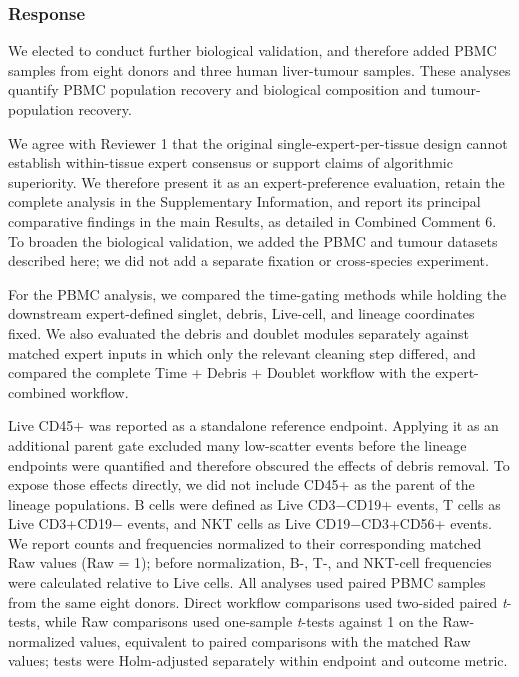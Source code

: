 \documentclass[
  11pt,
  a4paper,
]{article}
\begin{document}
\subsubsection{Response}\label{response-2}

We elected to conduct further biological validation, and therefore added
PBMC samples from eight donors and three human liver-tumour samples.
These analyses quantify PBMC population recovery and biological
composition and tumour-population recovery.

We agree with Reviewer 1 that the original single-expert-per-tissue
design cannot establish within-tissue expert consensus or support claims
of algorithmic superiority. We therefore present it as an
expert-preference evaluation, retain the complete analysis in the
Supplementary Information, and report its principal comparative findings
in the main Results, as detailed in Combined Comment 6. To broaden the
biological validation, we added the PBMC and tumour datasets described
here; we did not add a separate fixation or cross-species experiment.

For the PBMC analysis, we compared the time-gating methods while holding
the downstream expert-defined singlet, debris, Live-cell, and lineage
coordinates fixed. We also evaluated the debris and doublet modules
separately against matched expert inputs in which only the relevant
cleaning step differed, and compared the complete Time + Debris +
Doublet workflow with the expert-combined workflow.

Live CD45+ was reported as a standalone reference endpoint. Applying it
as an additional parent gate excluded many low-scatter events before the
lineage endpoints were quantified and therefore obscured the effects of
debris removal. To expose those effects directly, we did not include
CD45+ as the parent of the lineage populations. B cells were defined as
Live CD3−CD19+ events, T cells as Live CD3+CD19− events, and NKT cells
as Live CD19−CD3+CD56+ events. We report counts and frequencies
normalized to their corresponding matched Raw values (Raw = 1); before
normalization, B-, T-, and NKT-cell frequencies were calculated relative
to Live cells. All analyses used paired PBMC samples from the same eight
donors. Direct workflow comparisons used two-sided paired
\emph{t}-tests, while Raw comparisons used one-sample \emph{t}-tests
against 1 on the Raw-normalized values, equivalent to paired comparisons
with the matched Raw values; tests were Holm-adjusted separately within
endpoint and outcome metric.
\end{document}
